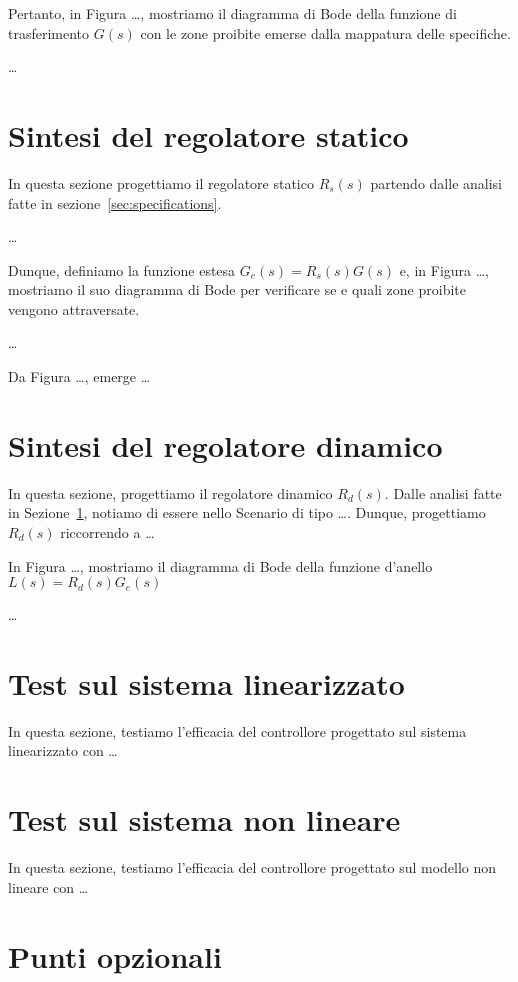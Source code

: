 \documentclass[a4paper, 11pt]{article}
\begin{document}
Pertanto, in Figura \dots, mostriamo il diagramma di Bode della funzione di trasferimento $G(s)$ con le zone proibite emerse dalla mappatura delle specifiche.

\dots

\section{Sintesi del regolatore statico}
\label{sec:static_regulator}

In questa sezione progettiamo il regolatore statico $R_s(s)$ partendo dalle analisi fatte in sezione~\ref{sec:specifications}.

\dots

Dunque, definiamo la funzione estesa $G_e(s) = R_s(s)G(s)$ e, in Figura \dots, mostriamo il suo diagramma di Bode per verificare se e quali zone proibite vengono attraversate.

\dots

Da Figura \dots, emerge \dots


\section{Sintesi del regolatore dinamico}

In questa sezione, progettiamo il regolatore dinamico $R_d(s)$. 
%
Dalle analisi fatte in Sezione~\ref{sec:static_regulator}, notiamo di essere nello Scenario di tipo \dots. Dunque, progettiamo $R_d(s)$ riccorrendo a \dots


In Figura \dots, mostriamo il diagramma di Bode della funzione d'anello $L(s) = R_d(s) G_e(s)$

\dots

\section{Test sul sistema linearizzato}

In questa sezione, testiamo l'efficacia del controllore progettato sul sistema linearizzato con \dots

\section{Test sul sistema non lineare}

In questa sezione, testiamo l'efficacia del controllore progettato sul modello non lineare con \dots


\section{Punti opzionali}
\end{document}
